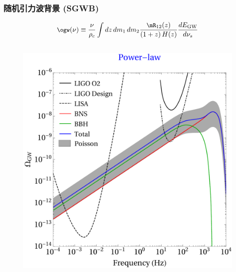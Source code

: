 \documentclass[xcolor={svgnames},compress]{beamer}
\def\({\left(}
\def\){\right)}
\def\({\left(}
\def\){\right)}
\begin{document}
\begin{frame}
    \frametitle{随机引力波背景 (SGWB)}
    \vspace{-2mm}
    \begin{block}{}\vspace{-1mm}
        \[\small{
            \ogw(\nu) \equiv \frac{\nu}{\rho_c} \int dz\, dm_1\, dm_2 
            \frac{\mR_{12}(z)}{\(1+z\) H(z)} 
            \frac{dE_{\rm{GW}}}{d\nu_s}
        }
        \]
    \end{block}
    \vspace{-2mm}
    \begin{columns}
        \begin{column}{0.54\textwidth} 
            \begin{figure}[htbp!]
                \centering
                \includegraphics[width = \textwidth]{./pic/omegagw-power.pdf}
            \end{figure}

\end{column}
\end{columns}
\end{frame}
\end{document}
